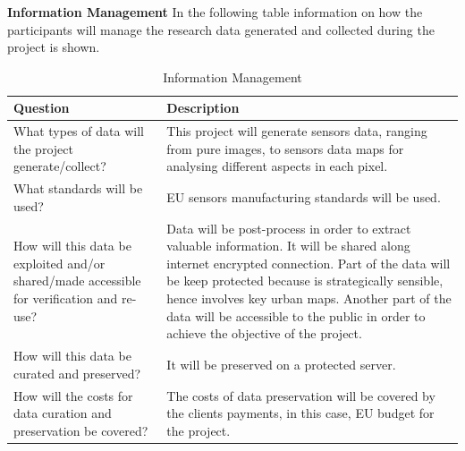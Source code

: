 \textbf{Information Management}
In the following table information on how the participants will manage the research data generated and collected during the project is shown.
\begin{table}[H]
	\centering
	\begin{tabular}{p{7cm} p{7cm}}
		
		\toprule[2pt]
		
		\textbf{Question} &  \textbf{Description}\\
		
		\midrule [1.5pt]
		
		What types of data will the project generate/collect?  & This project will generate sensors data, ranging from pure images, to sensors data maps for analysing different aspects in each pixel.\vspace{0.2cm}\\
		
		\midrule
		
		What standards will be used?  & EU sensors manufacturing standards will be used.\vspace{0.2cm}\\
		
		\midrule
		
		How will this data be exploited and/or shared/made accessible for verification and re-use? & Data will be post-process in order to extract valuable information. It will be shared along internet encrypted connection. Part of the data will be keep protected because is strategically sensible, hence involves key urban maps. Another part of the data will be accessible to the public in order to achieve the objective of the project.\vspace{0.2cm}\\
		
		\midrule
		
		How will this data be curated and preserved? & It will be preserved on a protected server.\vspace{0.2cm}\\
		
		\midrule
		
		How will the costs for data curation and preservation be covered? & The costs of data preservation will be covered by the clients payments, in this case, EU budget for the project.\vspace{0.2cm}\\	
		
		\bottomrule[2pt]
		
	\end{tabular}
	\caption{Information Management}
\end{table}

